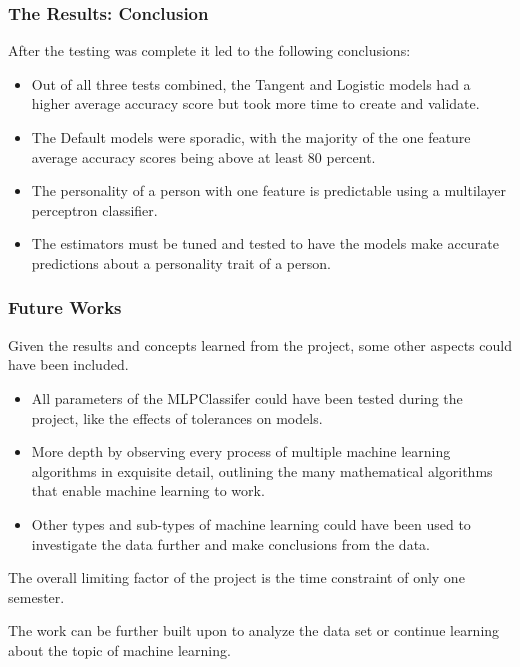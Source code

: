\documentclass{beamer}
\begin{document}
\begin{frame}
\frametitle{The Results: Conclusion}
\footnotesize
After the testing was complete it led to the following conclusions:
\begin{itemize}
\item Out of all three tests combined, the Tangent and Logistic models had a higher average accuracy score but took more time to create and validate. 
\item The Default models were sporadic, with the majority of the one feature average accuracy scores being above at least 80 percent.

\item The personality of a person with one feature is predictable using a multilayer perceptron classifier. 

\item The estimators must be tuned and tested to have the models make accurate predictions about a personality trait of a person.
\end{itemize}

\end{frame}


\begin{frame}
\frametitle{Future Works}
\footnotesize
Given the results and concepts learned from the project, some other aspects could have been included.
\begin{itemize}
\item All parameters of the MLPClassifer could have been tested during the project, like the effects of tolerances on models.
\item More depth by observing every process of multiple machine learning algorithms in exquisite detail, outlining the many mathematical algorithms that enable machine learning to work.
\item Other types and sub-types of machine learning could have been used to investigate the data further and make conclusions from the data.
\end{itemize}
The overall limiting factor of the project is the time constraint of only one semester. 
\newline

The work can be further built upon to analyze the data set or continue learning about the topic of machine learning.

\end{frame}
\end{document}
